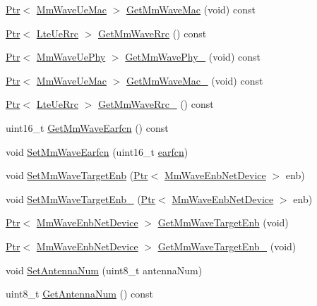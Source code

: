 \begin{DoxyCompactItemize}
\item 
\hyperlink{classns3_1_1Ptr}{Ptr}$<$ \hyperlink{classns3_1_1MmWaveUeMac}{Mm\+Wave\+Ue\+Mac} $>$ \hyperlink{classns3_1_1McUeNetDevice_a0242a9444c49eb456fab5328ff5557a5}{Get\+Mm\+Wave\+Mac} (void) const 
\item 
\hyperlink{classns3_1_1Ptr}{Ptr}$<$ \hyperlink{classns3_1_1LteUeRrc}{Lte\+Ue\+Rrc} $>$ \hyperlink{classns3_1_1McUeNetDevice_a3aa43e27f38bee12e7d99236865c38f7}{Get\+Mm\+Wave\+Rrc} () const 
\item 
\hyperlink{classns3_1_1Ptr}{Ptr}$<$ \hyperlink{classns3_1_1MmWaveUePhy}{Mm\+Wave\+Ue\+Phy} $>$ \hyperlink{classns3_1_1McUeNetDevice_ae8ec1bdb25792e1c11c810076bed55f6}{Get\+Mm\+Wave\+Phy\+\_} (void) const 
\item 
\hyperlink{classns3_1_1Ptr}{Ptr}$<$ \hyperlink{classns3_1_1MmWaveUeMac}{Mm\+Wave\+Ue\+Mac} $>$ \hyperlink{classns3_1_1McUeNetDevice_aff5e658ea4419a5af39af89d2d7ba694}{Get\+Mm\+Wave\+Mac\+\_} (void) const 
\item 
\hyperlink{classns3_1_1Ptr}{Ptr}$<$ \hyperlink{classns3_1_1LteUeRrc}{Lte\+Ue\+Rrc} $>$ \hyperlink{classns3_1_1McUeNetDevice_a7876f5ccf58f940d401b23dc5d1de35b}{Get\+Mm\+Wave\+Rrc\+\_} () const 
\item 
uint16\+\_\+t \hyperlink{classns3_1_1McUeNetDevice_a9b077b2cfbce754d2de7118c25f656f0}{Get\+Mm\+Wave\+Earfcn} () const 
\item 
void \hyperlink{classns3_1_1McUeNetDevice_a8c605bdad65c52d69b201bf303cb969f}{Set\+Mm\+Wave\+Earfcn} (uint16\+\_\+t \hyperlink{generate__test__data__lte__spectrum__value__txpsd_8m_a584be7562abb392609629331f8c6c42c}{earfcn})
\item 
void \hyperlink{classns3_1_1McUeNetDevice_ac7569907bee5af5735be2cc35d07e219}{Set\+Mm\+Wave\+Target\+Enb} (\hyperlink{classns3_1_1Ptr}{Ptr}$<$ \hyperlink{classns3_1_1MmWaveEnbNetDevice}{Mm\+Wave\+Enb\+Net\+Device} $>$ enb)
\item 
void \hyperlink{classns3_1_1McUeNetDevice_a90f74451f12eaa815938713611e23e4e}{Set\+Mm\+Wave\+Target\+Enb\+\_} (\hyperlink{classns3_1_1Ptr}{Ptr}$<$ \hyperlink{classns3_1_1MmWaveEnbNetDevice}{Mm\+Wave\+Enb\+Net\+Device} $>$ enb)
\item 
\hyperlink{classns3_1_1Ptr}{Ptr}$<$ \hyperlink{classns3_1_1MmWaveEnbNetDevice}{Mm\+Wave\+Enb\+Net\+Device} $>$ \hyperlink{classns3_1_1McUeNetDevice_ad80d87e0ba8a3f3568c4b18b82a206b8}{Get\+Mm\+Wave\+Target\+Enb} (void)
\item 
\hyperlink{classns3_1_1Ptr}{Ptr}$<$ \hyperlink{classns3_1_1MmWaveEnbNetDevice}{Mm\+Wave\+Enb\+Net\+Device} $>$ \hyperlink{classns3_1_1McUeNetDevice_a6100f6f0022df579885724dae57bd45b}{Get\+Mm\+Wave\+Target\+Enb\+\_} (void)
\item 
void \hyperlink{classns3_1_1McUeNetDevice_a7ac4c9bc44730e689658e89afe61148e}{Set\+Antenna\+Num} (uint8\+\_\+t antenna\+Num)
\item 
uint8\+\_\+t \hyperlink{classns3_1_1McUeNetDevice_a3cbb3903c6431a29dc4ec50886181e18}{Get\+Antenna\+Num} () const 
\end{DoxyCompactItemize}
